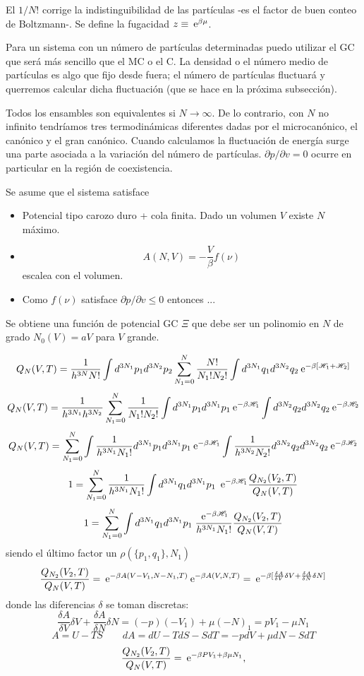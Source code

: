 \documentclass[10pt,oneside]{CBFT_book}
\begin{document}
El $1/N!$ corrige la indistinguibilidad de las partículas -es el factor de buen conteo de Boltzmann-.
Se define la fugacidad $ z \equiv \:\mathrm{e}^{ \beta \mu } $.

Para un sistema con un número de partículas determinadas puedo utilizar el GC que será más sencillo
que el MC o el C. La densidad o el número medio de partículas es algo que fijo desde fuera; el número
de partículas fluctuará y querremos calcular dicha fluctuación (que se hace en la próxima
subsección).

Todos los ensambles son equivalentes si $N \to \infty$. De lo contrario, con $N$ no infinito
tendríamos tres termodinámicas diferentes dadas por el microcanónico, el canónico y el gran canónico.
Cuando calculamos la fluctuación de energía surge una parte asociada a la variación del número de
partículas. $\partial p / \partial v = 0$ ocurre en particular en la región de coexistencia.

Se asume que el sistema satisface
\begin{itemize}
 \item Potencial tipo carozo duro + cola finita. Dado un volumen $V$ existe $N$ máximo.
 \item \[
	A(N,V) = - \frac{V}{\beta} f(\nu)
 \]
 escalea con el volumen.
 \item Como $f(\nu)$ satisface $ \partial p / \partial v \leq 0$ entonces ...
\end{itemize}

Se obtiene una función de potencial GC $\Xi$ que debe ser un polinomio en $N$ de grado 
$N_0(V) = a V$ para $V$ grande.


\[
	Q_N (V,T) =  \frac{1}{h^{3N}N!} \int d^{3N_1}p_1 d^{3N_2}p_2  \sum_{N_1=0}^N \frac{N!}{N_1! N_2!}
	\int d^{3N_1}q_1 d^{3N_2}q_2 \:\mathrm{e}^{-\beta [\mathscr{H}_1 + \mathscr{H}_2 ]}
\]
\[
	Q_N (V,T) =  \frac{1}{h^{3N_1} h^{3N_2} } \sum_{N_1=0}^N \frac{1}{N_1! N_2!}
	\int d^{3N_1}p_1 d^{3N_1}p_1 \:\mathrm{e}^{-\beta\mathscr{H}_1} \int d^{3N_2}q_2 d^{3N_2}q_2 \:\mathrm{e}^{-\beta\mathscr{H}_2}
\]
\[
	Q_N (V,T) =  \sum_{N_1=0}^N \int \frac{1}{h^{3N_1}N_1!} d^{3N_1}p_1 d^{3N_1}p_1 \:\mathrm{e}^{-\beta \mathscr{H}_1 }
	\int \frac{1}{h^{3N_2}N_2!} d^{3N_2}q_2 d^{3N_2}q_2 \:\mathrm{e}^{-\beta \mathscr{H}_2 }
\]
\[
	1 = 
	\sum_{N_1=0}^N \frac{1}{h^{3N_1}N_1!} \int d^{3N_1}q_1 d^{3N_1}p_1 \; 
	\:\mathrm{e}^{-\beta\mathscr{H}_1} \frac{Q_{N_2}(V_2,T)}{Q_N(V,T)} 
\]
\[
	1 = 
	\sum_{N_1=0}^N \int d^{3N_1}q_1 d^{3N_1}p_1 \; \frac{\:\mathrm{e}^{-\beta\mathscr{H}_1}}{h^{3N_1}N_1!} 
	\frac{Q_{N_2}(V_2,T)}{Q_N(V,T)} 
\]
siendo el último factor un $ \rho(\{ p_1,q_1\},N_1)$
\[
	\frac{Q_{N_2}(V_2,T)}{Q_N(V,T)} = \:\mathrm{e}^{-\beta A (V-V_1,N-N_1,T)}\:\mathrm{e}^{-\beta A (V,N,T)} =
	\:\mathrm{e}^{-\beta [ \frac{\delta A}{\delta V} \delta V + \frac{\delta A}{\delta N} \delta N ] }
\]
donde las diferencias $\delta$ se toman discretas:
\[
	\frac{\delta A}{\delta V} \delta V + \frac{\delta A}{\delta N} \delta N =
	(-p )(-V_1) + \mu (-N)_1 = pV_1 - \mu N_1
\]
\[
	A = U - TS \qquad dA = dU - TdS - SdT = -pdV + \mu dN - SdT
\]
\[
	\frac{Q_{N_2}(V_2,T)}{Q_N(V,T)} = \:\mathrm{e}^{-\beta PV_1 + \beta \mu N_1},
\]
\end{document}
